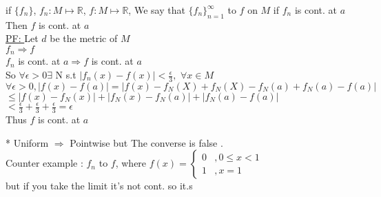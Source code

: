 \documentclass[12pt]{article}
\begin{document}
\begin{tcolorbox}[colback=blue!5!white,colframe=blue!75!black,title=Theorem:]
   if $\{f_n\}$, $f_n:M \longmapsto\mathbb{R}$, $f:M\longmapsto\mathbb{R}$, We say that $\{f_n\}_{n=1}^\infty${\color{red}{ converges uniformly}} to $f$ on $M$ if $f_n$ is cont. at $a$ Then $f$ is cont. at $a$ \\ 
   {\color{blue}\underline {PF: }} Let $d$ be the metric of $M$ \\ $f_n \Rightarrow f$ \\ $f_n$ is cont. at $a \Rightarrow f$ is cont. at $a$ \\
   So $\forall \epsilon >0  \exists$ N s.t $|f_n(x)-f(x)| < \frac{\epsilon}{3} ,$ $\forall x \in M$ \\ 
   $\forall \epsilon >0 , |f(x)-f(a)| = |f(x)-f_N(X)+f_N(X)-f_N(a)+f_N(a) -f(a)|$ \\
   $\leq |f(x)-f_N(x)| +|f_N(x)-f_N(a)|+|f_N(a)-f(a)|$\\
   $ < \frac{\epsilon}{3} + \frac{\epsilon}{3} + \frac{\epsilon}{3} =\epsilon$
    \\
   Thus $f$ is cont. at $a$ 
\end{tcolorbox}
\begin{tcolorbox}[colback=blue!5!white,colframe=red!75!black,title=Note :]
* Uniform $\Rightarrow $ Pointwise  but The converse is false . \\ Counter example : $f_n$ {\color{red}{converges pointwise}} to $f$, where 
$f(x)=\begin{cases} 
      0 &,0\leq x< 1\\
      1 &,x=1
\end{cases}$\\
but if you take the limit it's not cont. so it.s{\color{red}{ not convergence uniformly}}
\end{tcolorbox}
\end{document}
